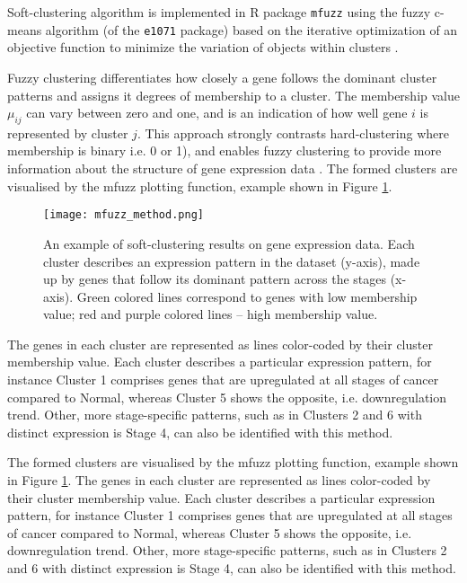 Soft-clustering algorithm is implemented in R package \texttt{mfuzz} \cite{Kumar2007Mfuzz:Data}  using the fuzzy c-means algorithm (of the \texttt{e1071} package) based on the iterative optimization of an
objective function to minimize the variation of objects within clusters  \cite{Bezdek1981PatternAlgorithms}.
 
Fuzzy clustering differentiates how closely a gene follows the dominant cluster patterns and  assigns it degrees of membership to a cluster. The membership value $\mu_{ij}$ can vary between zero and one, and is an indication of how well gene $i$ is represented by cluster $j$. This approach strongly contrasts hard-clustering where membership is binary i.e. 0 or 1), and enables fuzzy clustering to provide more information about the structure of gene expression data \cite{Kumar2007Mfuzz:Data}. 
The formed clusters are visualised by the mfuzz plotting function, example shown in Figure \ref{fig:mfuzzmethod}. 

            \begin{figure}[h]
            \centering
            \texttt{[image: mfuzz\_method.png]}
            \caption{An example of soft-clustering results on gene expression data. Each cluster describes an expression pattern in the dataset (y-axis), made up by genes that follow its dominant pattern across the stages (x-axis).  Green colored lines correspond to genes with low membership value; red and purple colored lines -- high membership value.              
            }
            \label{fig:mfuzzmethod}
            \end{figure}
            
 The genes in each cluster are represented as lines color-coded by their cluster membership value.  Each cluster describes a particular expression pattern, for instance Cluster 1 comprises genes that are upregulated at all stages of cancer compared to Normal, whereas Cluster 5 shows the opposite, i.e. downregulation trend. Other, more stage-specific patterns, such as in Clusters 2 and 6 with distinct expression is Stage 4, can also be identified with this method. 
 
The formed clusters are visualised by the mfuzz plotting function, example shown in Figure \ref{fig:mfuzzmethod}. The genes in each cluster are represented as lines color-coded by their cluster membership value.  Each cluster describes a particular expression pattern, for instance Cluster 1 comprises genes that are upregulated at all stages of cancer compared to Normal, whereas Cluster 5 shows the opposite, i.e. downregulation trend. Other, more stage-specific patterns, such as in Clusters 2 and 6 with distinct expression is Stage 4, can also be identified with this method. 
 
